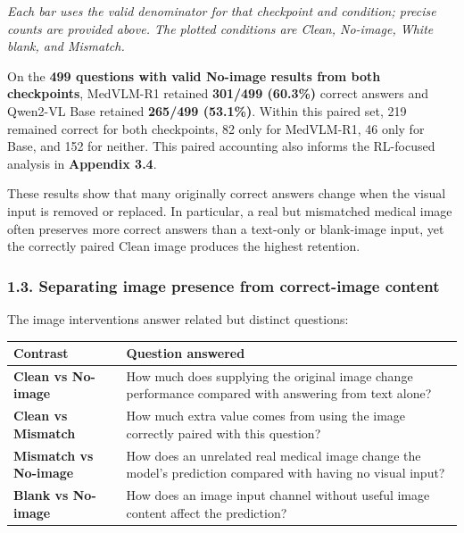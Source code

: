 \documentclass[
  10pt,
  a4paper,
]{article}
\newcounter{none} %
\begin{document}
\emph{Each bar uses the valid denominator for that checkpoint and
condition; precise counts are provided above. The plotted conditions are
Clean, No-image, White blank, and Mismatch.}

On the \textbf{499 questions with valid No-image results from both
checkpoints}, MedVLM-R1 retained \textbf{301/499 (60.3\%)} correct
answers and Qwen2-VL Base retained \textbf{265/499 (53.1\%)}. Within
this paired set, 219 remained correct for both checkpoints, 82 only for
MedVLM-R1, 46 only for Base, and 152 for neither. This paired accounting
also informs the RL-focused analysis in \textbf{Appendix 3.4}.

These results show that many originally correct answers change when the
visual input is removed or replaced. In particular, a real but
mismatched medical image often preserves more correct answers than a
text-only or blank-image input, yet the correctly paired Clean image
produces the highest retention.

\subsubsection{1.3. Separating image presence from correct-image
content}\label{separating-image-presence-from-correct-image-content}

The image interventions answer related but distinct questions:

{\def\LTcaptype{none} %
\begin{longtable}[]{@{}
  >{\raggedright\arraybackslash}p{}
  >{\raggedright\arraybackslash}p{}@{}}
\toprule\noalign{}
\begin{minipage}[b]{\linewidth}\raggedright
Contrast
\end{minipage} & \begin{minipage}[b]{\linewidth}\raggedright
Question answered
\end{minipage} \\
\midrule\noalign{}
\endhead
\bottomrule\noalign{}
\endlastfoot
\textbf{Clean vs No-image} & How much does supplying the original image
change performance compared with answering from text alone? \\
\textbf{Clean vs Mismatch} & How much extra value comes from using the
image correctly paired with this question? \\
\textbf{Mismatch vs No-image} & How does an unrelated real medical image
change the model's prediction compared with having no visual input? \\
\textbf{Blank vs No-image} & How does an image input channel without
useful image content affect the prediction? \\
\end{longtable}
}
\end{document}

